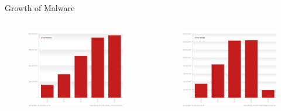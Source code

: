 \documentclass[]{beamer}
\begin{document}
\begin{frame}[plain]{Growth of Malware}
  \begin{columns}
    \begin{column}{5cm}
      \begin{figure}[H]
        \begin{center}
          \includegraphics[scale=0.18]{figures/malware_all.png}
        \end{center}
      \end{figure}
    \end{column}
    \begin{column}{5cm}
      \begin{figure}[H]
        \begin{center}
          \includegraphics[scale=0.18]{figures/malware_new.png}

\end{center}
\end{figure}
\end{column}
\end{columns}
\end{frame}
\end{document}
